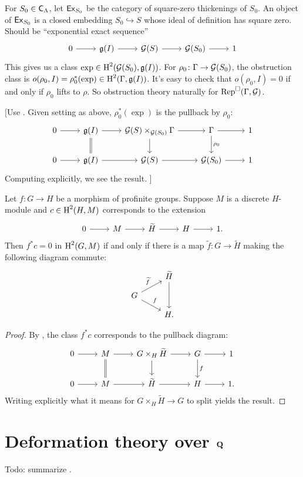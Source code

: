 For $S_0\in \mathsf{C}_\Lambda$, let $\mathsf{Ex}_{S_0}$ be the category of square-zero 
thickenings of $S_0$. An object of $\mathsf{Ex}_{S_0}$ is a closed embedding 
$S_0\hookrightarrow S$ whose ideal of definition has square zero. Should be 
``exponential exact sequence''
\[
\begin{tikzcd}
	0 \ar[r]
		& \fg(I) \ar[r]
		& \cG(S) \ar[r]
		& \cG(S_0) \ar[r]
		& 1
\end{tikzcd}
\]
This gives us a class $\exp\in \operatorname{H}^2(\mathcal{G}(S_0),\mathfrak{g}(I))$. For 
$\rho_0\colon \Gamma\to \mathcal{G}(S_0)$, the obstruction class is 
$o(\rho_0,I) = \rho_0^\ast(\exp)\in \operatorname{H}^2(\Gamma,\mathfrak{g}(I))$. It's easy to check 
that $o(\rho_0,I)=0$ if and only if $\rho_0$ lifts to $\rho$. So obstruction 
theory naturally for $\operatorname{Rep}^\square(\Gamma,\mathcal{G})$. 

[Use \cite[6.6.4]{weibel-1994}. Given setting as above, $\rho_0^\ast(\exp)$ is 
the pullback by $\rho_0$:
\[
\begin{tikzcd}
	0 \ar[r] 
		& \fg(I) \ar[r] \ar[d, equals]
		& \cG(S)\times_{\cG(S_0)} \Gamma \ar[r] \ar[d] 
		& \Gamma \ar[d, "\rho_0"] \ar[r]
		& 1 \\
	0 \ar[r] 
		& \fg(I) \ar[r]
		& \cG(S) \ar[r] 
		& \cG(S_0) \ar[r] 
		& 1
\end{tikzcd}
\]
Computing explicitly, we see the result. 
]

\begin{proposition}
Let $f\colon G\to H$ be a morphism of profinite groups. Suppose $M$ is a 
discrete $H$-module and $c\in \operatorname{H}^2(H,M)$ corresponds to the extension 
\[
\begin{tikzcd}
	0 \ar[r]
		& M \ar[r]
		& \widetilde H \ar[r]
		& H \ar[r] 
		& 1 .
\end{tikzcd}
\]
Then $f^\ast c=0$ in $\operatorname{H}^2(G,M)$ if and only if there is a map 
$\widetilde f\colon G\to \widetilde H$ making the following diagram commute: 
\[
\begin{tikzcd}[row sep=small]
	& \widetilde H \ar[dd] \\
	G \ar[ur, "\widetilde f"] \ar[dr, "f"] \\
	& H .
\end{tikzcd}
\]
\end{proposition}
\begin{proof}
By \cite[6.6.4]{weibel-1994}, the class $f^\ast c$ corresponds to the pullback 
diagram: 
\[
\begin{tikzcd}
	0 \ar[r]
		& M \ar[r] \ar[d, equals]
		& G\times_H \widetilde{H} \ar[r] \ar[d] 
		& G \ar[r] \ar[d, "f"]
		& 1 \\
	0 \ar[r]
		& M \ar[r]
		& \widetilde H \ar[r]
		& H \ar[r] 
		& 1 .
\end{tikzcd}
\]
Writing explicitly what it means for $G\times_H \widetilde H \to G$ to split 
yields the result. 
\end{proof}





\section{Deformation theory over \texorpdfstring{$\mathbf{Q}$}{Q}}

Todo: summarize \cite{pande-2011}. 

